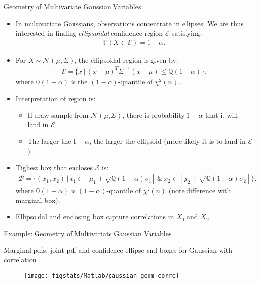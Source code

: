 \documentclass[9pt]{beamer}
\begin{document}
%
\begin{frame}{Geometry of Multivariate Gaussian Variables}

\begin{itemize}
\setlength{\itemsep}{5pt}
\item  In multivariate Gaussians, observations concentrate in ellipses. We are thus interested in finding {\em ellipsoidal} confidence region $\mathcal{E}$ satisfying:
\begin{align*}
\mathbb{P}(X\in \mathcal{E})=1-\alpha.
\end{align*}
\item For $X\sim \mathcal{N}(\mu,\Sigma)$, the ellipsoidal region is given by:
\begin{align*}
\mathcal{E}=\{x\,|\,(x-\mu)^T\Sigma^{-1}(x-\mu)\leq \mathbb{Q}(1-\alpha)\}.
\end{align*}
where $\mathbb{Q}(1-\alpha)$ is the $(1-\alpha)$-quantile of $\chi^2(n)$.  
\item  Interpretation of region is:
\begin{itemize}
\item If draw sample from $\mathcal{N}(\mu,\Sigma)$, there is probability $1-\alpha$ that it will land in $\mathcal{E}$
\item The larger the $1-\alpha$, the larger the ellipsoid (more likely it is to land in $\mathcal{E}$)
\end{itemize}
\item Tighest box that encloses $\mathcal{E}$ is:
\begin{align*}
\mathcal{B}=\{(x_1,x_2)\,|\,x_1\in [\mu_1\pm \sqrt{\mathbb{Q}(1-\alpha)}\sigma_1]\,\&\,x_2\in [\mu_2\pm \sqrt{\mathbb{Q}(1-\alpha)}\sigma_2]\}.
\end{align*}
where $\mathbb{Q}(1-\alpha)$ is  $(1-\alpha)$-quantile of $\chi^2(n)$ (note difference with marginal box). 
\item Ellipsoidal and enclosing box capture correlations in $X_1$ and $X_2$.
\end{itemize}

\end{frame}

%
\begin{frame}{Example: Geometry of Multivariate Gaussian Variables}

Marginal pdfs, joint pdf and confidence ellipse and boxes for Gaussian with correlation. 
\begin{figure}[!htb]
    \centering
	\texttt{[image: figstats/Matlab/gaussian\_geom\_corre]}
\end{figure}

\end{frame}
\end{document}
